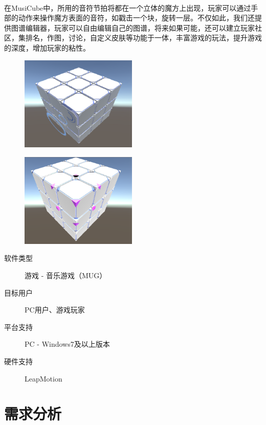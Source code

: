 \documentclass{article}
\begin{document}
\paragraph{}
在MusiCube中，所用的音符节拍将都在一个立体的魔方上出现，玩家可以通过手部的动作来操作魔方表面的音符，如戳击一个块，旋转一层。不仅如此，我们还提供图谱编辑器，玩家可以自由编辑自己的图谱，将来如果可能，还可以建立玩家社区，集排名，作图，讨论，自定义皮肤等功能于一体，丰富游戏的玩法，提升游戏的深度，增加玩家的粘性。
\begin{figure}[H]
  \begin{minipage}{0.5\linewidth}
    \includegraphics[width=15em]{mid-demo1.png}\\
    \caption{}\label{demo1}
  \end{minipage}
  \begin{minipage}{0.5\linewidth}
    \includegraphics[width=15em]{mid-demo2.png}\\
    \caption{}\label{demo2}
  \end{minipage}
\end{figure}
\begin{description}
  \item[软件类型] 游戏 - 音乐游戏（MUG）
  \item[目标用户] PC用户、游戏玩家
  \item[平台支持] PC - Windows7及以上版本
  \item[硬件支持] LeapMotion
\end{description}
\newpage
\section{需求分析}
\end{document}
